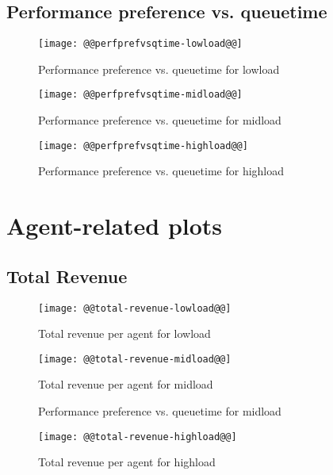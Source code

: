 \documentclass[11pt]{article}
\begin{document}
\newpage
\subsection{Performance preference vs. queuetime}
\begin{figure}[htbp]
  \begin{center}
    \texttt{[image: @@perfprefvsqtime-lowload@@]}
    \caption{Performance preference vs. queuetime for lowload}
    \label{fig:perfprefvsqtime-lowload}
  \end{center}
\end{figure}
\begin{figure}[htbp]
  \begin{center}
    \texttt{[image: @@perfprefvsqtime-midload@@]}
    \caption{Performance preference vs. queuetime for midload}
    \label{fig:perfprefvsqtime-midload}
  \end{center}
\end{figure}
\begin{figure}[htbp]
  \begin{center}
    \texttt{[image: @@perfprefvsqtime-highload@@]}
    \caption{Performance preference vs. queuetime for highload}
    \label{fig:perfprefvsqtime-highload}
  \end{center}
\end{figure}

\newpage
\section{Agent-related plots}
\subsection{Total Revenue}\label{sub:total_revenue}
\begin{figure}[htbp]
  \begin{center}
    \texttt{[image: @@total-revenue-lowload@@]}
    \caption{Total revenue per agent for lowload}
    \label{fig:total-revenue-lowload}
  \end{center}
\end{figure}
\begin{figure}[htbp]
  \begin{center}
    \texttt{[image: @@total-revenue-midload@@]}
    \caption{Total revenue per agent for midload}
    \caption{Performance preference vs. queuetime for midload}
    \label{fig:total-revenue-midload}
  \end{center}
\end{figure}
\begin{figure}[htbp]
  \begin{center}
    \texttt{[image: @@total-revenue-highload@@]}
    \caption{Total revenue per agent for highload}
    \label{fig:total-revenue-highload}
  \end{center}
\end{figure}
\end{document}
